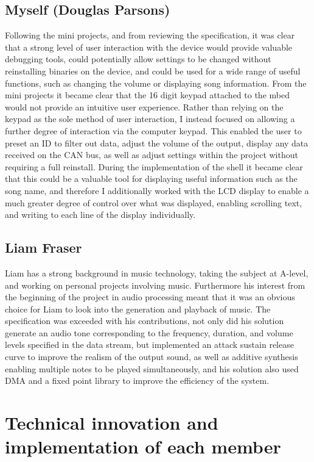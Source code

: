 \subsection*{Myself (Douglas Parsons)}
Following the mini projects, and from reviewing the specification, it was clear 
that a strong level of user interaction with the device would provide valuable 
debugging tools, could potentially allow settings to be changed without 
reinstalling binaries on the device, and could be used for a wide range of 
useful functions, such as changing the volume or displaying song information. 
From the mini projects it became clear that the 16 digit keypad attached to the 
mbed would not provide an intuitive user experience. Rather than relying on 
the keypad as the sole method of user interaction, I instead focused 
on allowing a further degree of interaction via the computer keypad. This 
enabled the user to preset an ID to filter out data, adjust the volume of the 
output, display any data received on the CAN bus, as 
well as adjust settings within the project without requiring a full reinstall.
During the implementation of the shell it became clear that this could be a 
valuable tool for displaying useful information such as the song name, and 
therefore I additionally worked with the LCD display to enable a much greater 
degree of control over what was displayed, enabling scrolling text, and writing 
to each line of the display individually.

\subsection*{Liam Fraser}
Liam has a strong background in music technology, taking the subject at A-level,
and working on personal projects involving music. Furthermore his interest from 
the beginning of the project in audio processing meant that it was an obvious 
choice for Liam to look into the generation and playback of music. The 
specification was exceeded with his contributions, not only did his solution 
generate an audio tone corresponding to the frequency, duration, and volume 
levels specified in the data stream, but implemented an attack sustain release 
curve to improve the realism of the output sound, as well as additive synthesis 
enabling multiple notes to be played simultaneously, and his solution also 
used DMA and a fixed point library to improve the efficiency of the system. 

\section{Technical innovation and implementation of each member}
